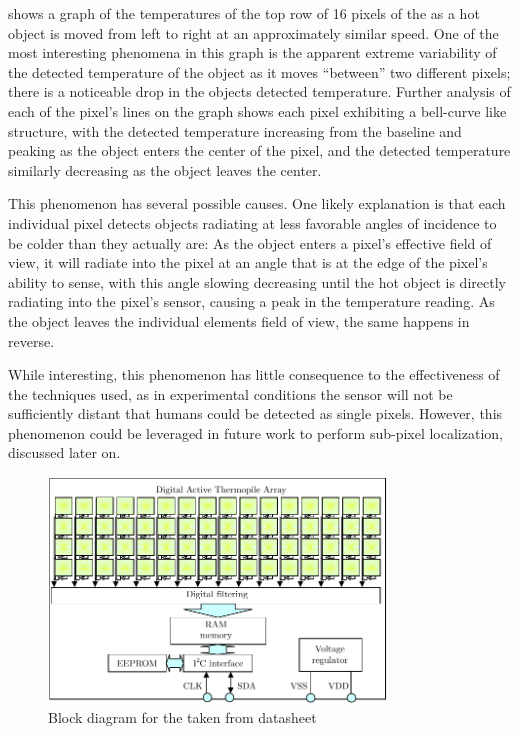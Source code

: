 \documentclass[../thesis/thesis.tex]{subfiles}
\begin{document}
 shows a graph of the temperatures of the top row of 16 pixels of the \mlx as a hot object is moved from left to right at an approximately similar speed. One of the most interesting phenomena in this graph is the apparent extreme variability of the detected temperature of the object as it moves ``between'' two different pixels; there is a noticeable drop in the objects detected temperature. Further analysis of each of the pixel's lines on the graph shows each pixel exhibiting a bell-curve like structure, with the detected temperature increasing from the baseline and peaking as the object enters the center of the pixel, and the detected temperature similarly decreasing as the object leaves the center. 

This phenomenon has several possible causes. One likely explanation is that each individual pixel detects objects radiating at less favorable angles of incidence to be colder than they actually are: As the object enters a pixel's effective field of view, it will radiate into the pixel at an angle that is at the edge of the pixel's ability to sense, with this angle slowing decreasing until the hot object is directly radiating into the pixel's sensor, causing a peak in the temperature reading. As the object leaves the individual elements field of view, the same happens in reverse.

While interesting, this phenomenon has little consequence to the effectiveness of the techniques used, as in experimental conditions the sensor will not be sufficiently distant that humans could be detected as single pixels. However, this phenomenon could be leveraged in future work to perform sub-pixel localization, discussed later on.


\begin{figure}
\centering
\includegraphics[width=0.8\textwidth]{../diagrams/mlx-block-diagram.pdf}
\caption{Block diagram for the \mlx taken from datasheet \cite{MLXDatasheet}}
\label{fig:exps:blockdia}
\end{figure}
\end{document}

